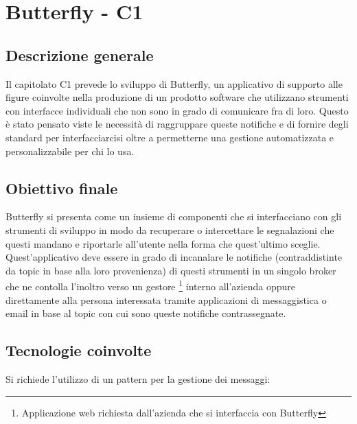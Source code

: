 \section{Butterfly - C1} \label{c1}
    \subsection{Descrizione generale}
    Il capitolato C1 prevede lo sviluppo di Butterfly, un applicativo di supporto alle figure coinvolte nella produzione di un prodotto software che utilizzano strumenti con interfacce individuali che non sono in grado di comunicare fra di loro.
    Questo  è stato pensato viste le necessità di raggruppare queste notifiche e di fornire degli standard per interfacciarcisi oltre a permetterne una gestione automatizzata e personalizzabile per chi lo usa.

    \subsection{Obiettivo finale}
    Butterfly si presenta come un insieme di componenti che si interfacciano con gli strumenti di sviluppo in modo da recuperare o intercettare le segnalazioni che questi mandano e riportarle all'utente nella forma che quest'ultimo sceglie.\\
    Quest'applicativo deve essere in grado di incanalare le notifiche (contraddistinte da topic in base alla loro provenienza) di questi strumenti in un singolo broker che ne contolla l'inoltro verso un gestore%
    \footnote{Applicazione web richiesta dall'azienda che si interfaccia con Butterfly} interno all'azienda oppure direttamente alla persona interessata tramite applicazioni di messaggistica
    o email in base al topic con cui sono queste notifiche contrassegnate.

    \subsection{Tecnologie coinvolte}
    Si richiede l'utilizzo di un pattern  per la gestione dei messaggi:

